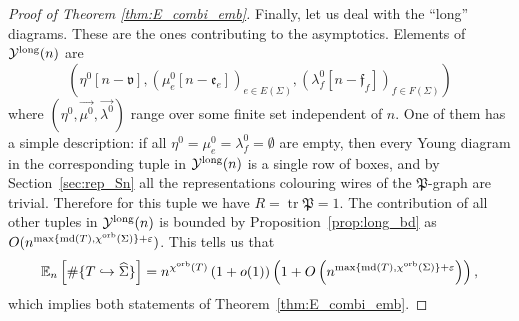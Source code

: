 \documentclass{amsart}
\newcommand{\cho}{\chi^{\textnormal{orb}}}
\newcommand{\md}{\textnormal{md}}
\newcommand{\tn}{\textnormal}
\newcommand{\tr}{\operatorname{tr}}
\newcommand{\whS}{{\widehat{\Sigma}}}
\begin{document}
\begin{proof}[Proof of Theorem \ref{thm:E_combi_emb}]
Finally, let us deal with the ``long'' diagrams. These are the ones contributing to the asymptotics. Elements of $\mathcal{Y}^\tn{long}(n)$ are
\begin{equation*}
\left(\eta^0[n-\mathfrak{v}],\left(\mu^0_e[n-\mathfrak{e}_e]\right)_{e\in E(\Sigma)},\left(\lambda^0_f[n-\mathfrak{f}_f]\right)_{f\in F(\Sigma)}\right)
\end{equation*}
where $(\eta^0,\vec{\mu^0},\vec{\lambda^0})$ range over some finite set independent of $n$. One of them has a simple description: if all $\eta^0=\mu^0_e=\lambda^0_f=\emptyset$ are empty, then every Young diagram in the corresponding tuple in $\mathcal{Y}^\tn{long}(n)$ is a single row of boxes, and by Section~\ref{sec:rep_Sn} all the representations colouring wires of the $\mathfrak{P}$-graph are trivial. Therefore for this tuple we have $R=\tr\mathfrak{P}=1$. The contribution of all other tuples in $\mathcal{Y}^\tn{long}(n)$ is bounded by Proposition~\ref{prop:long_bd} as $O(n^{\max\{\md(T),\cho(\Sigma)\}+\varepsilon})$. This tells us that
\begin{equation*}
\mathbb{E}_n\left[\#\{T\hookrightarrow\whS\}\right]=n^{\cho(T)}\left(1+o(1)\right)\left(1+O\left(n^{\max\{\md(T),\cho(\Sigma)\}+\varepsilon}\right)\right),
\end{equation*}
which implies both statements of Theorem~\ref{thm:E_combi_emb}.
\end{proof}
\end{document}
